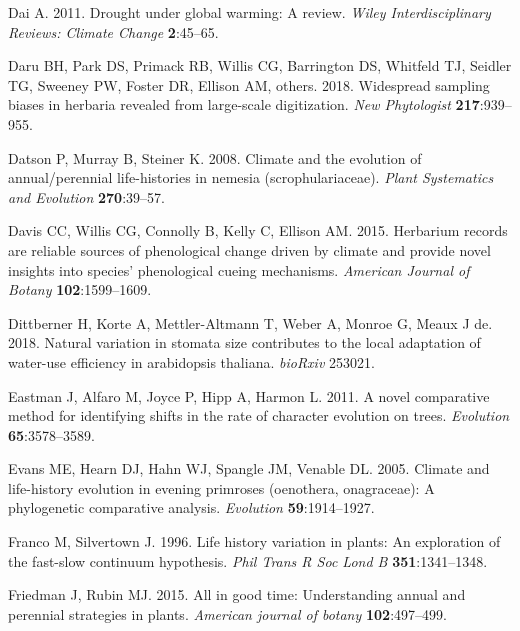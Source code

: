 \documentclass[man,floatsintext]{apa6}
\theoremstyle{definition}
\theoremstyle{definition}
\theoremstyle{definition}
\theoremstyle{remark}
\begin{document}
\leavevmode\hypertarget{ref-dai2011drought}{}%
Dai A. 2011. Drought under global warming: A review. \emph{Wiley
Interdisciplinary Reviews: Climate Change} \textbf{2}:45--65.

\leavevmode\hypertarget{ref-daru2018widespread}{}%
Daru BH, Park DS, Primack RB, Willis CG, Barrington DS, Whitfeld TJ,
Seidler TG, Sweeney PW, Foster DR, Ellison AM, others. 2018. Widespread
sampling biases in herbaria revealed from large-scale digitization.
\emph{New Phytologist} \textbf{217}:939--955.

\leavevmode\hypertarget{ref-datson2008climate}{}%
Datson P, Murray B, Steiner K. 2008. Climate and the evolution of
annual/perennial life-histories in nemesia (scrophulariaceae).
\emph{Plant Systematics and Evolution} \textbf{270}:39--57.

\leavevmode\hypertarget{ref-davis2015herbarium}{}%
Davis CC, Willis CG, Connolly B, Kelly C, Ellison AM. 2015. Herbarium
records are reliable sources of phenological change driven by climate
and provide novel insights into species' phenological cueing mechanisms.
\emph{American Journal of Botany} \textbf{102}:1599--1609.

\leavevmode\hypertarget{ref-dittberner2018natural}{}%
Dittberner H, Korte A, Mettler-Altmann T, Weber A, Monroe G, Meaux J de.
2018. Natural variation in stomata size contributes to the local
adaptation of water-use efficiency in arabidopsis thaliana.
\emph{bioRxiv} 253021.

\leavevmode\hypertarget{ref-R-geiger_b}{}%
Eastman J, Alfaro M, Joyce P, Hipp A, Harmon L. 2011. A novel
comparative method for identifying shifts in the rate of character
evolution on trees. \emph{Evolution} \textbf{65}:3578--3589.

\leavevmode\hypertarget{ref-evans2005climate}{}%
Evans ME, Hearn DJ, Hahn WJ, Spangle JM, Venable DL. 2005. Climate and
life-history evolution in evening primroses (oenothera, onagraceae): A
phylogenetic comparative analysis. \emph{Evolution}
\textbf{59}:1914--1927.

\leavevmode\hypertarget{ref-franco1996life}{}%
Franco M, Silvertown J. 1996. Life history variation in plants: An
exploration of the fast-slow continuum hypothesis. \emph{Phil Trans R
Soc Lond B} \textbf{351}:1341--1348.

\leavevmode\hypertarget{ref-friedman2015all}{}%
Friedman J, Rubin MJ. 2015. All in good time: Understanding annual and
perennial strategies in plants. \emph{American journal of botany}
\textbf{102}:497--499.
\end{document}

